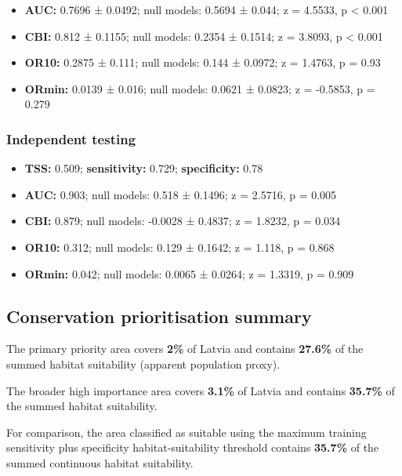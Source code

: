 \documentclass[
  openany]{book}
\providecommand{\tightlist}{%
  \setlength{\itemsep}{0pt}\setlength{\parskip}{0pt}}
\providecommand{\tightlist}{%
  \setlength{\itemsep}{0pt}%
  \setlength{\parskip}{0pt}%
}
\begin{document}
\begin{itemize}
\tightlist
\item
  \textbf{AUC:} 0.7696 ± 0.0492; null models: 0.5694 ± 0.044; z = 4.5533, p \textless{} 0.001
\item
  \textbf{CBI:} 0.812 ± 0.1155; null models: 0.2354 ± 0.1514; z = 3.8093, p \textless{} 0.001
\item
  \textbf{OR10:} 0.2875 ± 0.111; null models: 0.144 ± 0.0972; z = 1.4763, p = 0.93
\item
  \textbf{ORmin:} 0.0139 ± 0.016; null models: 0.0621 ± 0.0823; z = -0.5853, p = 0.279
\end{itemize}

\subsubsection*{Independent testing}\label{independent-testing-6}

\begin{itemize}
\tightlist
\item
  \textbf{TSS:} 0.509; \textbf{sensitivity:} 0.729; \textbf{specificity:} 0.78
\item
  \textbf{AUC:} 0.903; null models: 0.518 ± 0.1496; z = 2.5716, p = 0.005
\item
  \textbf{CBI:} 0.879; null models: -0.0028 ± 0.4837; z = 1.8232, p = 0.034
\item
  \textbf{OR10:} 0.312; null models: 0.129 ± 0.1642; z = 1.118, p = 0.868
\item
  \textbf{ORmin:} 0.042; null models: 0.0065 ± 0.0264; z = 1.3319, p = 0.909
\end{itemize}

\subsection*{Conservation prioritisation summary}\label{conservation-prioritisation-summary-6}

The primary priority area covers \textbf{2\%} of Latvia and contains \textbf{27.6\%} of the summed habitat suitability (apparent population proxy).

The broader high importance area covers \textbf{3.1\%} of Latvia and contains \textbf{35.7\%} of the summed habitat suitability.

For comparison, the area classified as suitable using the maximum training sensitivity plus specificity habitat-suitability threshold contains \textbf{35.7\%} of the summed continuous habitat suitability.
\end{document}
